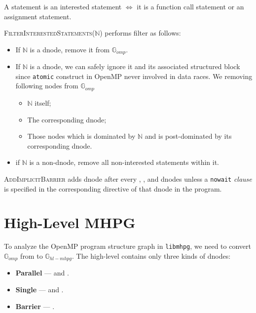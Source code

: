 \begin{mydef}
A statement is an interested statement $\iff$ it is a function call statement or an assignment statement.
\end{mydef}
\textsc{FilterInterestedStatements}($\mathbb{N}$) performs filter as follows:
\begin{itemize}
	\item If $\mathbb{N}$ is a  dnode, remove it from $\mathbb{G}_{omp}$.
	\item If $\mathbb{N}$ is a  dnode, we can safely ignore it and its associated structured block since \texttt{atomic} construct in OpenMP never involved in data races. We removing following nodes from $\mathbb{G}_{omp}$
	\begin{itemize}
		\item $\mathbb{N}$ itself;
		\item The corresponding  dnode;
		\item Those nodes which is dominated by $\mathbb{N}$ and is post-dominated by its corresponding  dnode.
	\end{itemize}
	\item if $\mathbb{N}$ is a non-dnode, remove all non-interested statements within it.
\end{itemize}

\textsc{AddImplicitBarrier} adds  dnode after every , ,  and  dnodes unless a \texttt{nowait} \textit{clause} is specified in the corresponding directive of that dnode in the program.

\section{High-Level MHPG}
\label{s:High-Level-MHPG}

To analyze the OpenMP program structure graph in \texttt{libmhpg}, we need to convert $\mathbb{G}_{omp}$ from  to $\mathbb{G}_{hl-mhpg}$. The high-level contains only three kinds of dnodes:
\begin{itemize}
	\item \textbf{Parallel} ---  and .
	\item \textbf{Single} ---  and .
	\item \textbf{Barrier} --- .
\end{itemize}

